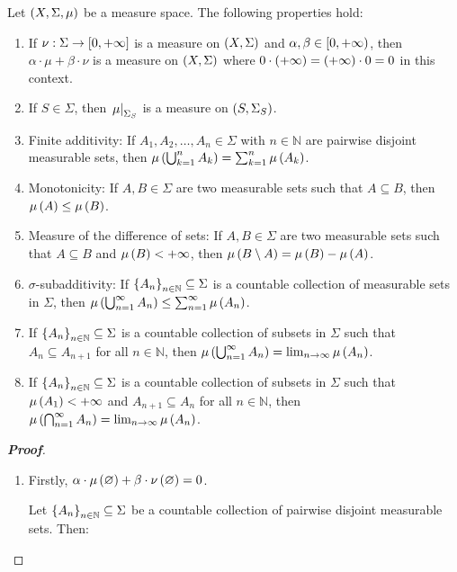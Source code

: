 \begin{proposition}
  Let $\left(X,\Sigma,\mu\right)$ be a measure space. The following properties hold:

  \begin{enumerate}
    \item If $\nu:\Sigma\rightarrow\left[0,+\infty\right]$ is a measure on $\left(X,\Sigma\right)$ and $\alpha,\beta\in\left[0,+\infty\right)$, then $\alpha\cdot\mu+\beta\cdot\nu$ is a measure on $\left(X,\Sigma\right)$ where $0\cdot\left(+\infty\right)=\left(+\infty\right)\cdot 0=0$ in this context.
    \item If $S\in\Sigma$, then $\left.\mu\right|_{\Sigma_S}$ is a measure on $\left(S,\Sigma_S\right)$.
    \item Finite additivity: If $A_1,A_2,\dots,A_n\in\Sigma$ with $n\in\mathbb{N}$ are pairwise disjoint measurable sets, then $\mu\left(\bigcup_{k=1}^{n}{A_k}\right)=\sum_{k=1}^{n}{\mu\left(A_k\right)}$.
    \item Monotonicity: If $A,B\in\Sigma$ are two measurable sets such that $A\subseteq B$, then $\mu\left(A\right)\leq\mu\left(B\right)$.
    \item Measure of the difference of sets: If $A,B\in\Sigma$ are two measurable sets such that $A\subseteq B$ and $\mu\left(B\right)<+\infty$, then $\mu\left(B\setminus A\right)=\mu\left(B\right)-\mu\left(A\right)$.
    \item $\sigma$-subadditivity: If $\left\{A_n\right\}_{n\in\mathbb{N}}\subseteq\Sigma$ is a countable collection of measurable sets in $\Sigma$, then $\mu\left(\bigcup_{n=1}^{\infty}{A_n}\right)\leq\sum_{n=1}^{\infty}{\mu\left(A_n\right)}$.
    \item If $\left\{A_n\right\}_{n\in\mathbb{N}}\subseteq\Sigma$ is a countable collection of subsets in $\Sigma$ such that $A_n\subseteq A_{n+1}$ for all $n\in\mathbb{N}$, then $\mu\left(\bigcup_{n=1}^{\infty}{A_n}\right)=\lim_{n\to\infty}{\mu\left(A_n\right)}$. 
    \item If $\left\{A_n\right\}_{n\in\mathbb{N}}\subseteq\Sigma$ is a countable collection of subsets in $\Sigma$ such that $\mu\left(A_1\right)<+\infty$ and $A_{n+1}\subseteq A_n$ for all $n\in\mathbb{N}$, then $\mu\left(\bigcap_{n=1}^{\infty}{A_n}\right)=\lim_{n\to\infty}{\mu\left(A_n\right)}$.
  \end{enumerate}
  \begin{proof}[\rm\textbf{Proof}]
    \hfill
    \begin{enumerate}
      \item Firstly, $\alpha\cdot\mu\left(\varnothing\right)+\beta\cdot\nu\left(\varnothing\right)=0$.
      
      Let $\left\{A_n\right\}_{n\in\mathbb{N}}\subseteq\Sigma$ be a countable collection of pairwise disjoint measurable sets. Then:


\end{enumerate}
\end{proof}
\end{proposition}
